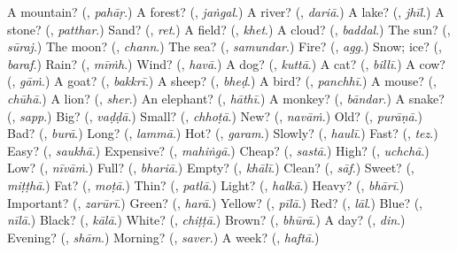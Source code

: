 \begin{tcolorbox}[breakable,colback=teal!4,colframe=teal!35!black,title={Before you move on}]
A mountain? (\textbf{}, \emph{pahāṛ}.) A forest? (\textbf{}, \emph{jaṅgal}.) A river? (\textbf{}, \emph{dariā}.) A lake? (\textbf{}, \emph{jhīl}.) A stone? (\textbf{}, \emph{patthar}.) Sand? (\textbf{}, \emph{ret}.) A field? (\textbf{}, \emph{khet}.) A cloud? (\textbf{}, \emph{baddal}.) The sun? (\textbf{}, \emph{sūraj}.) The moon? (\textbf{}, \emph{chann}.) The sea? (\textbf{}, \emph{samundar}.) Fire? (\textbf{}, \emph{agg}.) Snow; ice? (\textbf{}, \emph{baraf}.) Rain? (\textbf{}, \emph{mīṁh}.) Wind? (\textbf{}, \emph{havā}.) A dog? (\textbf{}, \emph{kuttā}.) A cat? (\textbf{}, \emph{billī}.) A cow? (\textbf{}, \emph{gāṁ}.) A goat? (\textbf{}, \emph{bakkrī}.) A sheep? (\textbf{}, \emph{bheḍ}.) A bird? (\textbf{}, \emph{panchhī}.) A mouse? (\textbf{}, \emph{chūhā}.) A lion? (\textbf{}, \emph{sher}.) An elephant? (\textbf{}, \emph{hāthī}.) A monkey? (\textbf{}, \emph{bāndar}.) A snake? (\textbf{}, \emph{sapp}.) Big? (\textbf{}, \emph{vaḍḍā}.) Small? (\textbf{}, \emph{chhoṭā}.) New? (\textbf{}, \emph{navāṁ}.) Old? (\textbf{}, \emph{purāṇā}.) Bad? (\textbf{}, \emph{burā}.) Long? (\textbf{}, \emph{lammā}.) Hot? (\textbf{}, \emph{garam}.) Slowly? (\textbf{}, \emph{haulī}.) Fast? (\textbf{}, \emph{tez}.) Easy? (\textbf{}, \emph{saukhā}.) Expensive? (\textbf{}, \emph{mahiṅgā}.) Cheap? (\textbf{}, \emph{sastā}.) High? (\textbf{}, \emph{uchchā}.) Low? (\textbf{}, \emph{nīvāṁ}.) Full? (\textbf{}, \emph{bhariā}.) Empty? (\textbf{}, \emph{khālī}.) Clean? (\textbf{}, \emph{sāf}.) Sweet? (\textbf{}, \emph{miṭṭhā}.) Fat? (\textbf{}, \emph{moṭā}.) Thin? (\textbf{}, \emph{patlā}.) Light? (\textbf{}, \emph{halkā}.) Heavy? (\textbf{}, \emph{bhārī}.) Important? (\textbf{}, \emph{zarūrī}.) Green? (\textbf{}, \emph{harā}.) Yellow? (\textbf{}, \emph{pīlā}.) Red? (\textbf{}, \emph{lāl}.) Blue? (\textbf{}, \emph{nīlā}.) Black? (\textbf{}, \emph{kālā}.) White? (\textbf{}, \emph{chiṭṭā}.) Brown? (\textbf{}, \emph{bhūrā}.) A day? (\textbf{}, \emph{din}.) Evening? (\textbf{}, \emph{shām}.) Morning? (\textbf{}, \emph{saver}.) A week? (\textbf{}, \emph{haftā}.)
\end{tcolorbox}
